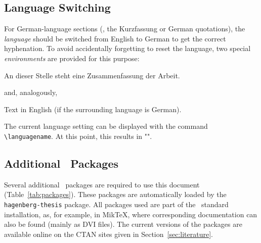 \subsection{Language Switching}
\label{sec:language-switching}

For German-language sections (\eg, the Kurzfassung or German quotations), the
\emph{language} should be switched from English to German to get the correct
hyphenation. To avoid accidentally forgetting to reset the language, two special
\emph{environments} are provided for this purpose:
%
\begin{LaTeXCode}[numbers=none]
\begin{german}
    An dieser Stelle steht eine Zusammenfassung der Arbeit.
\end{german}
\end{LaTeXCode}
%
and, analogously,
%
\begin{LaTeXCode}[numbers=none]
\begin{english}
    Text in English (if the surrounding language is German).
\end{english}
\end{LaTeXCode}
%
The current language setting can be displayed with the command
\verb!\languagename!. At this point, this results in
"\texttt{\languagename}".



\subsection{Additional \latex\ Packages}

Several additional \latex\ packages are required to use this document
(Table~\ref{tab:packages}). These packages are automatically loaded by the
\texttt{hagenberg-thesis} package. All packages used are part of the \latex\
standard installation, as, for example, in MikTeX, where corresponding
documentation can also be found (mainly as DVI files). The current versions of
the packages are available online on the CTAN sites given in
Section~\ref{sec:literature}.

